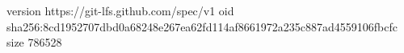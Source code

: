 version https://git-lfs.github.com/spec/v1
oid sha256:8cd1952707dbd0a68248e267ea62fd114af8661972a235c887ad4559106fbcfc
size 786528
